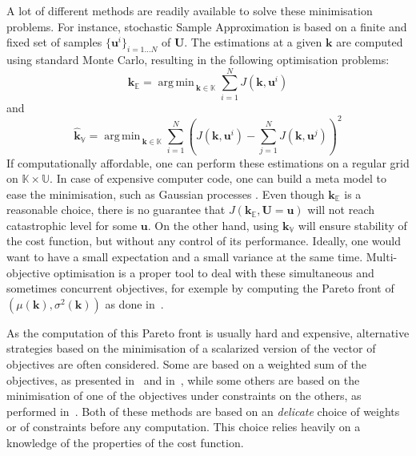 \documentclass[preprint, 1p]{elsarticle}
\DeclareMathOperator*{\argmin}{arg\,min \,}
\newcommand{\Ex}{\mathbb{E}}
\newcommand{\Prob}{\mathbb{P}}
\newcommand{\kmean}{{\mathbf{k}}_{\Ex}}
\newcommand{\hatkmean}{\hat{\mathbf{k}}_{\Ex}}
\newcommand{\kvar}{{\mathbf{k}}_{\mathbb{V}}}
\newcommand{\hatkvar}{\hat{\mathbf{k}}_{\mathbb{V}}}
\newcommand{\Kspace}{\mathbb{K}}
\newcommand{\Uspace}{\mathbb{U}}
\begin{document}
A lot of different methods are readily available to solve these
minimisation problems. For instance, stochastic Sample Approximation
\citep{juditsky_stochastic_2009,kim_guide_2015} is based on a finite
and fixed set of samples $\{ \mathbf{u}^{i}\}_{i=1 \dots N}$ of
$\mathbf{U}$.
The estimations at a given $\mathbf{k}$ are computed using standard Monte Carlo, resulting in the following optimisation problems:
\begin{equation}
\hatkmean = \argmin_{\mathbf{k} \in \Kspace} \sum_{i=1}^N  J(\mathbf{k},\mathbf{u}^i)
\end{equation}
and
\begin{equation}
\hatkvar = \argmin_{\mathbf{k} \in \Kspace} \sum_{i=1}^N  \left( J(\mathbf{k},\mathbf{u}^i) -  \sum_{j=1}^N  J(\mathbf{k},\mathbf{u}^j) \right )^2
\end{equation}
If computationally affordable, one can perform these estimations on a regular grid on $\Kspace \times \Uspace$. In case of expensive computer code, one can build a meta model to ease the minimisation, such as Gaussian processes \citep{janusevskis_simultaneous_2010}.
Even though $\kmean$ is a reasonable choice, there is no guarantee that $J(\kmean, \mathbf{U}=\mathbf{u})$ will not reach catastrophic level for some  $\mathbf{u}$. On the other hand, using $\kvar$ will ensure stability of the cost function, but without any control of its performance. %
%
%
Ideally, one would want to have a small expectation and a small variance at the same time. Multi-objective optimisation is a proper tool to deal with these simultaneous and sometimes concurrent objectives, for exemple by computing the Pareto front of $\left(\mu(\mathbf{k}),\sigma^2(\mathbf{k})\right)$ as done in~\cite{baudoui_optimisation_2012}.

As the computation of this Pareto front is usually hard and expensive, alternative strategies based on the minimisation of a scalarized version of the vector of objectives are often considered. Some are based on a weighted sum of the objectives, as presented in~\cite{grodzevich_normalization_2006} and in~\cite{marler_weighted_2010}, while some others are based on the minimisation of one of the objectives under constraints on the others, as performed in~\cite{lehman_designing_2004}. Both of these methods are based on an \textit{delicate} choice of weights or of constraints before any computation. This choice relies heavily on a knowledge of the properties of the cost function.
\end{document}
